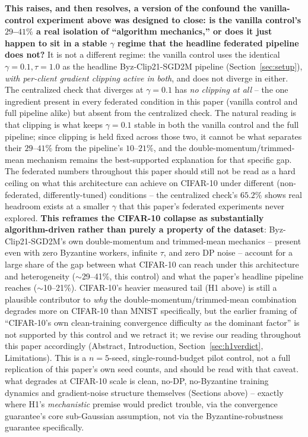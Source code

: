\documentclass{article}
\begin{document}
\textbf{This raises, and then resolves, a version of the confound the
vanilla-control experiment above was designed to close: is the vanilla
control's $29$--$41\%$ a real isolation of ``algorithm mechanics,'' or does it
just happen to sit in a stable $\gamma$ regime that the headline federated
pipeline does not?} It is not a different regime: the vanilla control uses
the identical $\gamma{=}0.1,\tau{=}1.0$ as the headline Byz-Clip21-SGD2M
pipeline (Section~\ref{sec:setup}), \emph{with per-client gradient clipping
active in both}, and does not diverge in either. The centralized check that
diverges at $\gamma{=}0.1$ has \emph{no clipping at all} -- the one
ingredient present in every federated condition in this paper (vanilla
control and full pipeline alike) but absent from the centralized check. The
natural reading is that clipping is what keeps $\gamma{=}0.1$ stable in both
the vanilla control and the full pipeline; since clipping is held fixed
across those two, it cannot be what separates their $29$--$41\%$ from the
pipeline's $10$--$21\%$, and the double-momentum/trimmed-mean mechanism
remains the best-supported explanation for that specific gap. The federated
numbers throughout this paper should still not be read as a hard ceiling on
what this architecture can achieve on CIFAR-10 under different (non-federated,
differently-tuned) conditions -- the centralized check's $65.2\%$ shows real
headroom exists at a smaller $\gamma$ that this paper's federated experiments
never explored.
\textbf{This
reframes the CIFAR-10 collapse as substantially algorithm-driven rather than
purely a property of the dataset}: Byz-Clip21-SGD2M's own double-momentum and
trimmed-mean mechanics -- present even with zero Byzantine workers, infinite
$\tau$, and zero DP noise -- account for a large share of the gap between
what CIFAR-10 can reach under this architecture and heterogeneity ($\sim$29--41\%,
this control) and what the paper's headline pipeline reaches ($\sim$10--21\%).
CIFAR-10's heavier measured tail (H1 above) is still a plausible contributor
to \emph{why} the double-momentum/trimmed-mean combination degrades more on
CIFAR-10 than MNIST specifically, but the earlier framing of ``CIFAR-10's own
clean-training convergence difficulty as the dominant factor'' is not
supported by this control and we retract it; we revise our reading throughout
this paper accordingly (Abstract, Introduction, Section~\ref{sec:h1verdict},
Limitations). This is a
$n{=}5$-seed, single-round-budget pilot control, not a full replication of
this paper's own seed counts, and should be read with that caveat.
what degrades at CIFAR-10 scale is clean, no-DP, no-Byzantine training
dynamics and gradient-noise structure themselves (Sections above) -- exactly
where H1's \emph{mechanistic} premise would predict trouble, via the
convergence guarantee's core sub-Gaussian assumption, not via the
Byzantine-robustness guarantee specifically.
\end{document}
